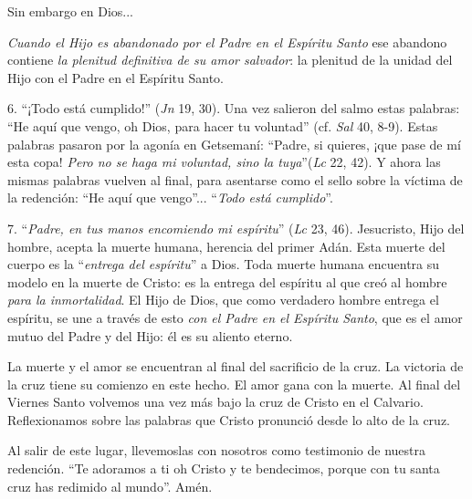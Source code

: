 			\begin{body}Sin embargo en Dios... \end{body}
			
			\begin{body}\textit{Cuando el Hijo es abandonado por el Padre en el Espíritu Santo} ese abandono contiene \textit{la plenitud definitiva de su amor salvador}: la plenitud de la unidad del Hijo con el Padre en el Espíritu Santo. \end{body}
			
			\begin{body}6. “¡Todo está cumplido!” (\textit{Jn }19, 30). Una vez salieron del salmo estas palabras: “He aquí que vengo, oh Dios, para hacer tu voluntad” (cf. \textit{Sal} 40, 8-9). Estas palabras pasaron por la agonía en Getsemaní: “Padre, si quieres, ¡que pase de mí esta copa! \textit{Pero no se haga mi voluntad, sino la tuya}”(\textit{Lc} 22, 42). Y ahora las mismas palabras vuelven al final, para asentarse como el sello sobre la víctima de la redención: “He aquí que vengo”... “\textit{Todo está cumplido}”. \end{body}
			
			\begin{body}7. “\textit{Padre, en tus manos encomiendo mi espíritu}” (\textit{Lc} 23, 46). Jesucristo, Hijo del hombre, acepta la muerte humana, herencia del primer Adán. Esta muerte del cuerpo es la “\textit{entrega del espíritu}” a Dios. Toda muerte humana encuentra su modelo en la muerte de Cristo: es la entrega del espíritu al que creó al hombre \textit{para la inmortalidad}. El Hijo de Dios, que como verdadero hombre entrega el espíritu, se une a través de esto \textit{con el Padre en el Espíritu Santo}, que es el amor mutuo del Padre y del Hijo: él es su aliento eterno. \end{body}
			
			\begin{body}La muerte y el amor se encuentran al final del sacrificio de la cruz. La victoria de la cruz tiene su comienzo en este hecho. El amor gana con la muerte. Al final del Viernes Santo volvemos una vez más bajo la cruz de Cristo en el Calvario. Reflexionamos sobre las palabras que Cristo pronunció desde lo alto de la cruz. \end{body}
			
			\begin{body}Al salir de este lugar, llevemoslas con nosotros como testimonio de nuestra redención. “Te adoramos a ti oh Cristo y te bendecimos, porque con tu santa cruz has redimido al mundo”. Amén.\end{body}
			
